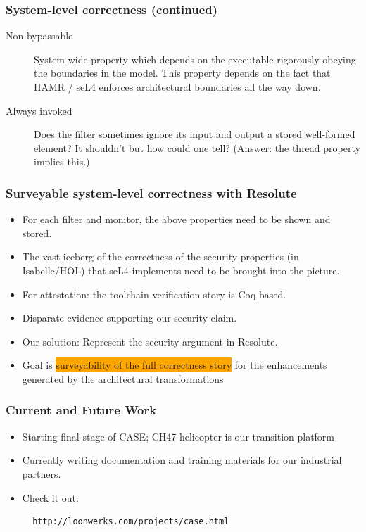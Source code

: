 \documentclass{beamer}
\begin{document}
\begin{frame}\frametitle{System-level correctness (continued)}

\begin{description}
   \item [Non-bypassable] System-wide property which depends on the
     executable rigorously obeying the boundaries in the model. This
     property depends on the fact that HAMR / seL4 enforces
     architectural boundaries all the way down.

   \item [Always invoked] Does the filter sometimes ignore its input
     and output a stored well-formed element? It shouldn't but how
     could one tell? (Answer: the thread property implies this.)

\end{description}
\end{frame}

\begin{frame}\frametitle{Surveyable system-level correctness with Resolute}

\begin{itemize}
\item For each filter and monitor, the above properties need to be shown and stored.

\item The vast iceberg of the correctness of the security properties
  (in Isabelle/HOL) that seL4 implements need to be brought into the
  picture.

\item For attestation: the toolchain verification story is Coq-based.

\item Disparate evidence supporting our security claim.

\item Our solution: Represent the security argument in Resolute.

\item Goal is \colorbox{orange}{surveyability of the full correctness
  story} for the enhancements generated by the architectural
  transformations

\end{itemize}

\end{frame}


\begin{frame}[fragile]\frametitle{Current and  Future Work}

\begin{itemize}
\item Starting final stage of CASE; CH47 helicopter is our transition platform

\item Currently writing documentation and training materials for our
  industrial partners.

\item Check it out:

\begin{verbatim}
  http://loonwerks.com/projects/case.html
\end{verbatim}

\end{itemize}
\end{frame}
\end{document}
